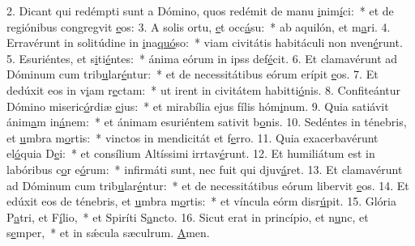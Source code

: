 2. Dicant qui redémpti sunt a Dómino, quos redémit de manu \uline{i}nim\uline{í}ci:~* et de regiónibus congregvit \uline{e}os:
3. A solis ortu, \uline{e}t occ\uline{á}su:~* ab aquilón, et m\uline{a}ri.
4. Erravérunt in solitúdine in \uline{i}na\uline{quó}so:~* viam civitátis habitáculi non nven\uline{é}runt.
5. Esuriéntes, et s\uline{i}ti\uline{é}ntes:~* ánima eórum in ipss def\uline{é}cit.
6. Et clamavérunt ad Dóminum cum trib\uline{u}lar\uline{é}ntur:~* et de necessitátibus eórum erípit \uline{e}os.
7. Et dedúxit eos in v\uline{i}am r\uline{e}ctam:~* ut irent in civitátem habitti\uline{ó}nis.
8. Confiteántur Dómino miseric\uline{ó}rdiæ \uline{e}jus:~* et mirabília ejus fílis hóm\uline{i}num.
9. Quia satiávit ánim\uline{a}m in\uline{á}nem:~* et ánimam esuriéntem sativit b\uline{o}nis.
10. Sedéntes in ténebris, et \uline{u}mbra m\uline{o}rtis:~* vinctos in mendicitát et f\uline{e}rro.
11. Quia exacerbavérunt el\uline{ó}quia D\uline{e}i:~* et consílium Altíssimi irrtav\uline{é}runt.
12. Et humiliátum est in labóribus c\uline{o}r e\uline{ó}rum:~* infirmáti sunt, nec fuit qui djuv\uline{á}ret.
13. Et clamavérunt ad Dóminum cum trib\uline{u}lar\uline{é}ntur:~* et de necessitátibus eórum libervit \uline{e}os.
14. Et edúxit eos de ténebris, et \uline{u}mbra m\uline{o}rtis:~* et víncula eórm disr\uline{ú}pit.
15. Glória P\uline{a}tri, et F\uline{í}lio,~* et Spiríti S\uline{a}ncto.
16. Sicut erat in princípio, et n\uline{u}nc, et s\uline{e}mper,~* et in sǽcula sæculrum. \uline{A}men.
